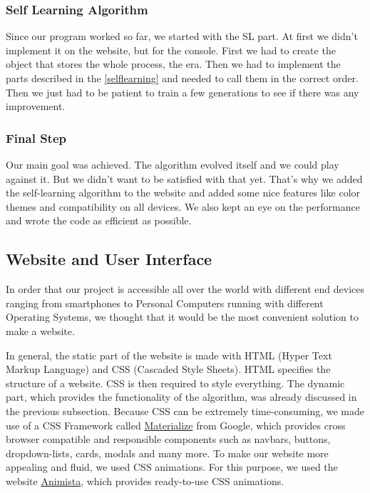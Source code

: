 \subsubsection{Self Learning Algorithm}
Since our program worked so far, we started with the \ac{SL} part. At first we didn't implement it on the website, but for the console. First we had to create the object that stores the whole process, the era. Then we had to implement the parts described in the \autoref{selflearning} and needed to call them in the correct order. Then we just had to be patient to train a few generations to see if there was any improvement.



\subsubsection{Final Step}
Our main goal was achieved. The algorithm evolved itself and we could play against it. But we didn't want to be satisfied with that yet. That's why we added the self-learning algorithm to the website and added some nice features like color themes and compatibility on all devices. We also kept an eye on the performance and wrote the code as efficient as possible.

\subsection{Website and User Interface} \label{websiteui}
In order that our project is accessible all over the world with different end devices ranging from smartphones to Personal Computers running with different Operating Systems, we thought that it would be the most convenient solution to make a website. 

In general, the static part of the website is made with HTML (Hyper Text Markup Language) and CSS (Cascaded Style Sheets). HTML specifies the structure of a website.  CSS is then required to style everything. The dynamic part, which provides the functionality of the algorithm, was already discussed in the previous subsection. 
Because CSS can be extremely time-consuming, we made use of a CSS Framework called \href{https://materializecss.com/}{Materialize} from Google, which provides cross browser compatible and responsible components such as navbars, buttons, dropdown-lists, cards, modals and many more. To make our website more appealing and fluid, we used CSS animations. For this purpose, we used the website \href{http://animista.net/}{Animista}, which provides ready-to-use CSS animations.

